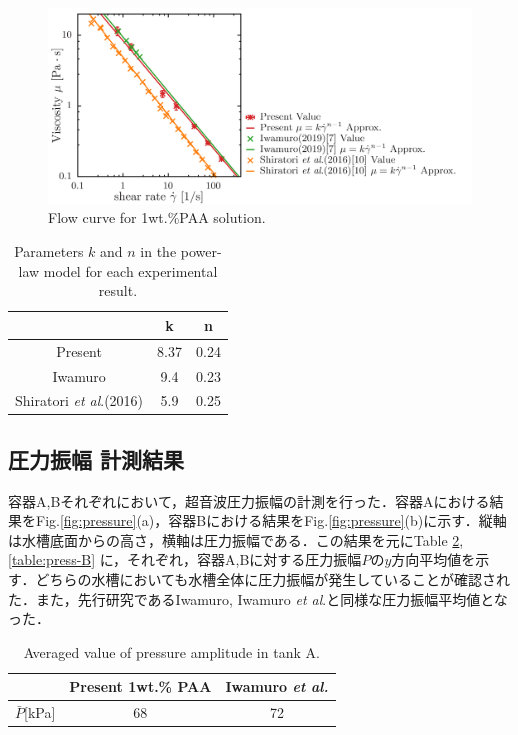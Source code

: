 \begin{figure}[ht]
    \centering
    \includegraphics[width=13cm,clip]{4-Results/PAA-viscosity.png}
    \caption{Flow curve for 1wt.\%PAA solution.}
    \label{fig:PAA-vis}
\end{figure}

\begin{table}[h]
    \centering
    \caption{Parameters $k$ and $n$ in the power-law model for each experimental result.}
    \label{table:power-law}
    \begin{tabular}{c|c|c} \hline
        & k & n \\ \hline \hline
        Present & 8.37 & 0.24 \\
        Iwamuro\cite{ref:8} & 9.4 & 0.23 \\
        Shiratori \textit{et al}.(2016)\cite{ref:10} & 5.9 & 0.25 \\ \hline
    \end{tabular}
\end{table}

\newpage

\subsection{圧力振幅 計測結果}

容器A,Bそれぞれにおいて，超音波圧力振幅の計測を行った．容器Aにおける結果をFig.\ref{fig:pressure}(a)，容器Bにおける結果をFig.\ref{fig:pressure}(b)に示す．縦軸は水槽底面からの高さ，横軸は圧力振幅である．この結果を元にTable \ref{table:press-A}, \ref{table:press-B} に，それぞれ，容器A,Bに対する圧力振幅$P$の$y$方向平均値を示す．どちらの水槽においても水槽全体に圧力振幅が発生していることが確認された．また，先行研究であるIwamuro\cite{ref:8}, Iwamuro \textit{et al}.\cite{ref:9}と同様な圧力振幅平均値となった．

\begin{table}[h]
    \centering
    \caption{Averaged value of pressure amplitude in tank A.}
    \label{table:press-A}
    \begin{tabular}{c|c|c}\hline
                       & Present 1wt.\% PAA & Iwamuro {\it et al.}\cite{ref:8} \\ \hline
        $\bar{P}$[kPa] &       68        & 72                              \\ \hline
    \end{tabular}
\end{table}

